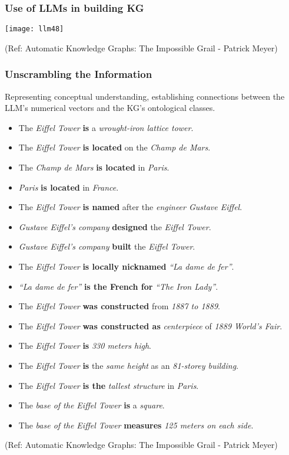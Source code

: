 \begin{frame}[fragile]\frametitle{Use of LLMs in building KG}

\begin{center}
\texttt{[image: llm48]}
\end{center}

{\tiny (Ref: Automatic Knowledge Graphs: The Impossible Grail - Patrick Meyer)}

\end{frame}

\begin{frame}[fragile]\frametitle{Unscrambling the Information}

Representing conceptual understanding, establishing connections between the LLM's numerical vectors and the KG's ontological classes.

\begin{itemize}
\item The {\it Eiffel Tower} {\bf is} a {\it wrought-iron lattice tower}.
\item The {\it Eiffel Tower} {\bf is located} on the {\it Champ de Mars}.
\item The {\it Champ de Mars} {\bf is located} in {\it Paris}.
\item {\it Paris} {\bf is located} in {\it France}.
\item The {\it Eiffel Tower} {\bf is named} after the {\it engineer Gustave Eiffel}.
\item {\it Gustave Eiffel’s company} {\bf designed} the {\it Eiffel Tower}.
\item {\it Gustave Eiffel’s company} {\bf built} the {\it Eiffel Tower}.
\item The {\it Eiffel Tower} {\bf is locally nicknamed} {\it ``La dame de fer''}.
\item {\it ``La dame de fer''} {\bf is the French for} {\it ``The Iron Lady''}.
\item The {\it Eiffel Tower} {\bf was constructed} from {\it 1887 to 1889}.
\item The {\it Eiffel Tower} {\bf was constructed as} {\it centerpiece} of {\it 1889 World’s Fair}.
\item The {\it Eiffel Tower} {\bf is} {\it 330 meters high}.
\item The {\it Eiffel Tower} {\bf is} the {\it same height} as an {\it 81-storey building}.
\item The {\it Eiffel Tower} {\bf is the} {\it tallest structure} in {\it Paris}.
\item The {\it base of the Eiffel Tower} {\bf is} a {\it square}.
\item The {\it base of the Eiffel Tower} {\bf measures} {\it 125 meters on each side}.
\end{itemize}

{\tiny (Ref: Automatic Knowledge Graphs: The Impossible Grail - Patrick Meyer)}

\end{frame}

